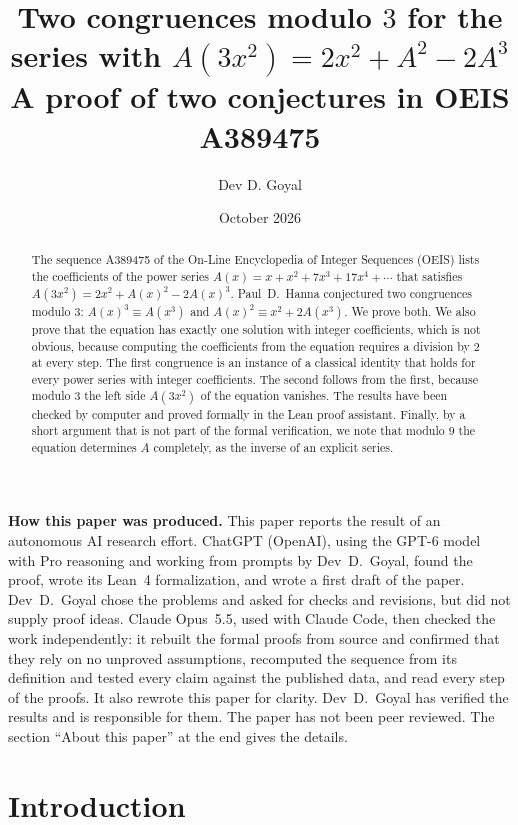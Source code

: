\documentclass[11pt,a4paper]{article}
\title{Two congruences modulo $3$ for the series with $A(3x^2)=2x^2+A^2-2A^3$\\[6pt]\large A proof of two conjectures in OEIS A389475}
\author{Dev D. Goyal}
\date{October 2026}
\theoremstyle{definition}
\theoremstyle{remark}
\begin{document}
\maketitle
\begin{abstract}
The sequence A389475 of the On-Line Encyclopedia of Integer Sequences (OEIS) lists the coefficients of the power series
$A(x)=x+x^2+7x^3+17x^4+\cdots$ that satisfies $A(3x^2)=2x^2+A(x)^2-2A(x)^3$. Paul~D.~Hanna conjectured two congruences
modulo $3$: $A(x)^3\equiv A(x^3)$ and $A(x)^2\equiv x^2+2A(x^3)$. We prove both. We also prove that the equation has
exactly one solution with integer coefficients, which is not obvious, because computing the coefficients from the
equation requires a division by $2$ at every step. The first congruence is an instance of a classical identity that
holds for every power series with integer coefficients. The second follows from the first, because modulo $3$ the left
side $A(3x^2)$ of the equation vanishes. The results have been checked by computer and proved formally in the Lean proof
assistant. Finally, by a short argument that is not part of the formal verification, we note that modulo $9$ the
equation determines $A$ completely, as the inverse of an explicit series.
\end{abstract}
\begin{center}\begin{minipage}{0.88\linewidth}\small
\textbf{How this paper was produced.} This paper reports the result of an autonomous AI research effort.
ChatGPT (OpenAI), using the GPT-6 model with Pro reasoning and working from prompts by Dev~D.~Goyal, found the proof, wrote its Lean~4 formalization, and wrote a first draft of the paper.
Dev~D.~Goyal chose the problems and asked for checks and revisions, but did not supply proof ideas.
Claude Opus~5.5, used with Claude Code, then checked the work independently: it rebuilt the formal proofs from
source and confirmed that they rely on no unproved assumptions, recomputed the sequence from its definition and tested
every claim against the published data, and read every step of the proofs. It also rewrote this paper for clarity.
Dev~D.~Goyal has verified the results and is responsible for them. The paper has not been peer reviewed.
The section ``About this paper'' at the end gives the details.
\end{minipage}\end{center}

\section{Introduction}
\end{document}
